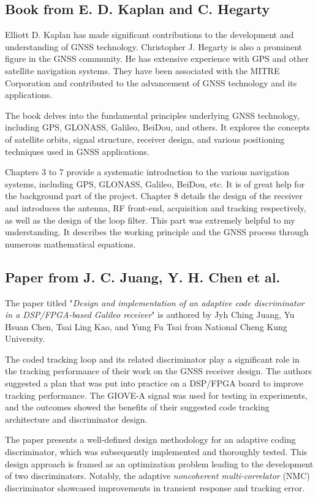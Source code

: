 \subsection{Book from E. D. Kaplan and C. Hegarty\texorpdfstring{\cite{RN177}}{}}
Elliott D. Kaplan has made significant contributions to the development and understanding of GNSS technology. Christopher J. Hegarty is also a prominent figure in the GNSS community. He has extensive experience with GPS and other satellite navigation systems. They have been associated with the MITRE Corporation and contributed to the advancement of GNSS technology and its applications.

The book delves into the fundamental principles underlying GNSS technology, including GPS, GLONASS, Galileo, BeiDou, and others. It explores the concepts of satellite orbits, signal structure, receiver design, and various positioning techniques used in GNSS applications.

Chapters 3 to 7 provide a systematic introduction to the various navigation systems, including GPS, GLONASS, Galileo, BeiDou, etc. It is of great help for the background part of the project. Chapter 8 details the design of the receiver and introduces the antenna, RF front-end, acquisition and tracking respectively, as well as the design of the loop filter. This part was extremely helpful to my understanding. It describes the working principle and the GNSS process through numerous mathematical equations.

\subsection{Paper from J. C. Juang, Y. H. Chen et al.\texorpdfstring{\cite{RN147}}{}}
The paper titled "\textit{Design and implementation of an adaptive code discriminator in a DSP/FPGA-based Galileo receiver}" is authored by Jyh Ching Juang, Yu Hsuan Chen, Tsai Ling Kao, and Yung Fu Tsai from National Cheng Kung University.

The coded tracking loop and its related discriminator play a significant role in the tracking performance of their work on the GNSS receiver design. The authors suggested a plan that was put into practice on a DSP/FPGA board to improve tracking performance. The GIOVE-A signal was used for testing in experiments, and the outcomes showed the benefits of their suggested code tracking architecture and discriminator design.

The paper presents a well-defined design methodology for an adaptive coding discriminator, which was subsequently implemented and thoroughly tested. This design approach is framed as an optimization problem leading to the development of two discriminators. Notably, the adaptive \textit{noncoherent multi-correlator} (NMC) discriminator showcased improvements in transient response and tracking error.

